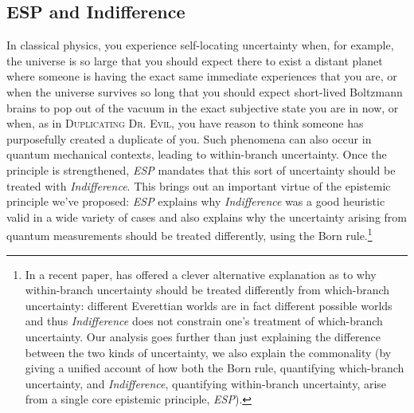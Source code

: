 \documentclass[12pt,onecolumn,secnumarabic,amsmath,amssymb,balancelastpage,nofootinbib]{article}
\begin{document}
\subsection{ESP and Indifference}\label{ESPIndifference}

In classical physics, you experience self-locating uncertainty when, for example, the universe is so large that you should expect there to exist a distant planet where someone is having the exact same immediate experiences that you are, or when the universe survives so long that you should expect short-lived Boltzmann brains to pop out of the vacuum in the exact subjective state you are in now, or when, as in \textsc{Duplicating Dr. Evil}, you have reason to think someone has purposefully created a duplicate of you.  Such phenomena can also occur in quantum mechanical contexts, leading to within-branch uncertainty.  Once the principle is strengthened, \emph{ESP} mandates that this sort of uncertainty should be treated with \emph{Indifference}.  This brings out an important virtue of the epistemic principle we've proposed: \emph{ESP} explains why \emph{Indifference} was a good heuristic valid in a wide variety of cases and also explains why the uncertainty arising from quantum measurements should be treated differently, using the Born rule.\footnote{{In a recent paper, \citep{wilson2015} has offered a clever alternative explanation as to why within-branch uncertainty should be treated differently from which-branch uncertainty: different Everettian worlds are in fact different possible worlds and thus \emph{Indifference} does not constrain one's treatment of which-branch uncertainty.  Our analysis goes further than just explaining the difference between the two kinds of uncertainty, we also explain the commonality (by giving a unified account of how both the Born rule, quantifying which-branch uncertainty, and \emph{Indifference}, quantifying within-branch uncertainty, arise from a single core epistemic principle, \emph{ESP}).\label{wilsonmove}}}
\end{document}
